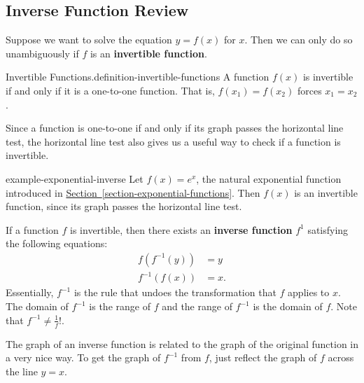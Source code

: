 \documentclass[10pt,]{book}
\newcommand{\terminology}[1]{\textbf{#1}}
\numberwithin{equation}{section}
\begin{document}
\subsection[{Inverse Function Review}]{Inverse Function Review}\label{subsection-inverse-function-review}
\hypertarget{p-198}{}%
Suppose we want to solve the equation \(y = f(x)\) for \(x\). Then we can only do so unambiguously if \(f\) is an \terminology{invertible function}.%
\begin{definition}{Invertible Functions.}{definition-invertible-functions}%
\hypertarget{p-199}{}%
A function \(f(x)\) is invertible if and only if it is a one-to-one function. That is, \(f(x_{1}) = f(x_{2})\) forces \(x_{1} = x_{2}\).%
\end{definition}
\hypertarget{p-200}{}%
Since a function is one-to-one if and only if its graph passes the horizontal line test, the horizontal line test also gives us a useful way to check if a function is invertible.%
\begin{example}{}{example-exponential-inverse}%
\hypertarget{p-201}{}%
Let \(f(x) = e^{x}\), the natural exponential function introduced in \hyperref[section-exponential-functions]{Section~\ref{section-exponential-functions}}. Then \(f(x)\) is an invertible function, since its graph passes the horizontal line test.%
\end{example}
\hypertarget{p-202}{}%
If a function \(f\) is invertible, then there exists an \terminology{inverse function} \(f^{1}\) satisfying the following equations:%
\begin{align*}
f(f^{-1}(y)) & = y \\
f^{-1}(f(x)) & = x. 
\end{align*}
Essentially, \(f^{-1}\) is the rule that undoes the transformation that \(f\) applies to \(x\). The domain of \(f^{-1}\) is the range of \(f\) and the range of \(f^{-1}\) is the domain of \(f\). Note that \(f^{-1}\neq\frac{1}{f}\)!.%
\par
\hypertarget{p-203}{}%
The graph of an inverse function is related to the graph of the original function in a very nice way. To get the graph of \(f^{-1}\) from \(f\), just reflect the graph of \(f\) across the line \(y=x\).%
\end{document}
